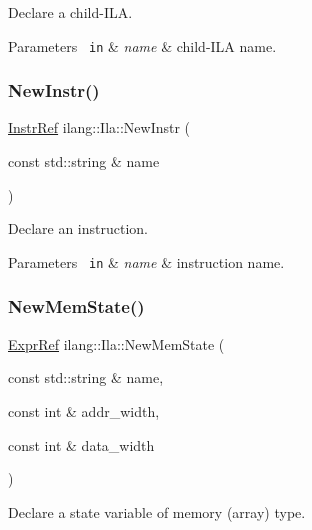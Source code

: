 Declare a child-\/\+I\+LA. 


\begin{DoxyParams}[1]{Parameters}
\mbox{\texttt{ in}}  & {\em name} & child-\/\+I\+LA name. \\
\hline
\end{DoxyParams}
\mbox{\label{classilang_1_1_ila_ac154deacddf086c175365744490a6405}} 
\subsubsection{\texorpdfstring{New\+Instr()}{NewInstr()}}
{\footnotesize\ttfamily \mbox{\hyperlink{classilang_1_1_instr_ref}{Instr\+Ref}} ilang\+::\+Ila\+::\+New\+Instr (\begin{DoxyParamCaption}\item[{const std\+::string \&}]{name }\end{DoxyParamCaption})}



Declare an instruction. 


\begin{DoxyParams}[1]{Parameters}
\mbox{\texttt{ in}}  & {\em name} & instruction name. \\
\hline
\end{DoxyParams}
\mbox{\label{classilang_1_1_ila_aba2cc80796a528ec4d051b08cc968d1e}} 
\subsubsection{\texorpdfstring{New\+Mem\+State()}{NewMemState()}}
{\footnotesize\ttfamily \mbox{\hyperlink{classilang_1_1_expr_ref}{Expr\+Ref}} ilang\+::\+Ila\+::\+New\+Mem\+State (\begin{DoxyParamCaption}\item[{const std\+::string \&}]{name,  }\item[{const int \&}]{addr\+\_\+width,  }\item[{const int \&}]{data\+\_\+width }\end{DoxyParamCaption})}



Declare a state variable of memory (array) type. 


